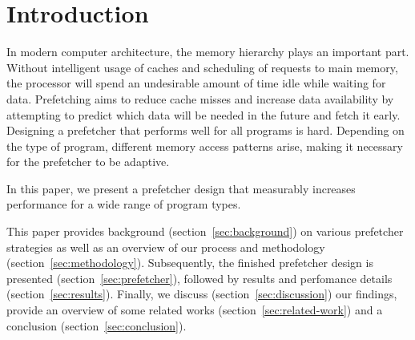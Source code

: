 \section{Introduction}
\label{sec:introduction}

In modern computer architecture, the memory hierarchy plays an important part.
Without intelligent usage of caches and scheduling of requests to main memory, the processor will spend an undesirable amount of time idle while waiting for data.
Prefetching aims to reduce cache misses and increase data availability by attempting to predict which data will be needed in the future and fetch it early. 
Designing a prefetcher that performs well for all programs is hard.
Depending on the type of program, different memory access patterns arise, making it necessary for the prefetcher to be adaptive.

In this paper, we present a prefetcher design that measurably increases performance for a wide range of program types.

This paper provides background (section~\ref{sec:background}) on various prefetcher strategies as well as an overview of our process and methodology (section~\ref{sec:methodology}).
Subsequently, the finished prefetcher design is presented (section~\ref{sec:prefetcher}), followed by results and perfomance details (section~\ref{sec:results}).
Finally, we discuss (section~\ref{sec:discussion}) our findings, provide an overview of some related works (section~\ref{sec:related-work}) and a conclusion (section~\ref{sec:conclusion}).

